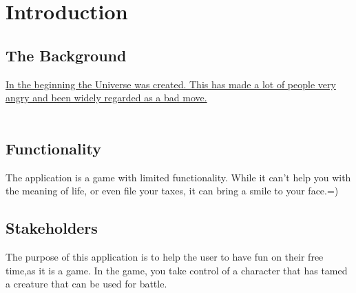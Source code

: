 \section{Introduction}

\begin{comment}
Give some background and explain the purpose of this application. Describe
the functionality of the application. Describe the stakeholders of the project,
highlight who will benefit from/use this particular application.
\end{comment}
\subsection{The Background}
\href{https://www.amazon.com/Restaurant-at-End-Universe/dp/0345391810}{
	In the beginning the Universe was created. This has made a lot of people very angry and been widely regarded as a bad move.}\\
\\

\subsection{Functionality}
The application is a game with limited functionality. While it can't help you with the meaning of life, or even file your taxes, it can bring a smile to your face.=)

\subsection{Stakeholders}
The purpose of this application is to help the user to have fun on their free time,as it is a game. In the game, you take control of a character that has tamed a creature that can be used for battle.



